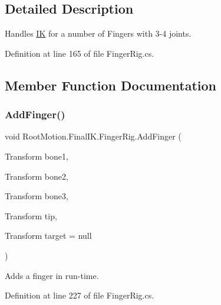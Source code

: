 \subsection{Detailed Description}
Handles \mbox{\hyperlink{class_root_motion_1_1_final_i_k_1_1_i_k}{IK}} for a number of Fingers with 3-\/4 joints. 



Definition at line 165 of file Finger\+Rig.\+cs.



\subsection{Member Function Documentation}
\mbox{\label{class_root_motion_1_1_final_i_k_1_1_finger_rig_a00b244631d9aa58b617df037522076e4}} 
\subsubsection{\texorpdfstring{Add\+Finger()}{AddFinger()}}
{\footnotesize\ttfamily void Root\+Motion.\+Final\+I\+K.\+Finger\+Rig.\+Add\+Finger (\begin{DoxyParamCaption}\item[{Transform}]{bone1,  }\item[{Transform}]{bone2,  }\item[{Transform}]{bone3,  }\item[{Transform}]{tip,  }\item[{Transform}]{target = {\ttfamily null} }\end{DoxyParamCaption})}



Adds a finger in run-\/time. 



Definition at line 227 of file Finger\+Rig.\+cs.

\mbox{\label{class_root_motion_1_1_final_i_k_1_1_finger_rig_a0473028172a161fbb647501464b6572c}} 
